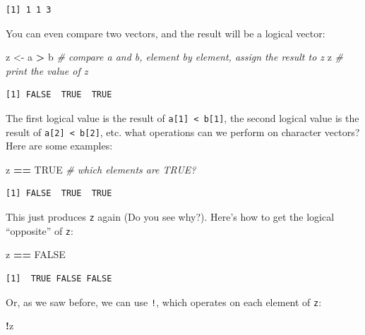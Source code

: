 \documentclass[
]{article}
\newenvironment{Shaded}{\begin{snugshade}}{\end{snugshade}}
\newcommand{\CommentTok}[1]{\textcolor[rgb]{0.56,0.35,0.01}{\textit{#1}}}
\newcommand{\NormalTok}[1]{#1}
\newcommand{\OperatorTok}[1]{\textcolor[rgb]{0.81,0.36,0.00}{\textbf{#1}}}
\newcommand{\OtherTok}[1]{\textcolor[rgb]{0.56,0.35,0.01}{#1}}
\newcommand{\StringTok}[1]{\textcolor[rgb]{0.31,0.60,0.02}{#1}}
\begin{document}
\begin{verbatim}
[1] 1 1 3
\end{verbatim}

You can even compare two vectors, and the result will be a logical vector:

\begin{Shaded}
\begin{Highlighting}[]
\NormalTok{z <-}\StringTok{ }\NormalTok{a }\OperatorTok{>}\StringTok{ }\NormalTok{b   }\CommentTok{# compare a and b, element by element, assign the result to z}
\NormalTok{z            }\CommentTok{# print the value of z}
\end{Highlighting}
\end{Shaded}

\begin{verbatim}
[1] FALSE  TRUE  TRUE
\end{verbatim}

The first logical value is the result of \texttt{a{[}1{]}\ \textless{}\ b{[}1{]}}, the second logical value is the result of \texttt{a{[}2{]}\ \textless{}\ b{[}2{]}}, etc.
what operations can we perform on character vectors?
Here are some examples:

\begin{Shaded}
\begin{Highlighting}[]
\NormalTok{z }\OperatorTok{==}\StringTok{ }\OtherTok{TRUE}   \CommentTok{# which elements are TRUE?}
\end{Highlighting}
\end{Shaded}

\begin{verbatim}
[1] FALSE  TRUE  TRUE
\end{verbatim}

This just produces \texttt{z} again (Do you see why?).
Here's how to get the logical ``opposite'' of \texttt{z}:

\begin{Shaded}
\begin{Highlighting}[]
\NormalTok{z }\OperatorTok{==}\StringTok{ }\OtherTok{FALSE}
\end{Highlighting}
\end{Shaded}

\begin{verbatim}
[1]  TRUE FALSE FALSE
\end{verbatim}

Or, as we saw before, we can use \texttt{!}, which operates on each element of \texttt{z}:

\begin{Shaded}
\begin{Highlighting}[]
\OperatorTok{!}\NormalTok{z}
\end{Highlighting}
\end{Shaded}
\end{document}
